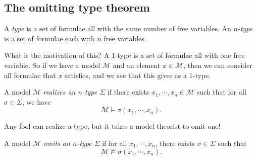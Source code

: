 \documentclass[a4paper]{article}
\begin{document}
%
%
%

\subsection{The omitting type theorem}
\begin{defi}[Type]
  A \emph{type} is a set of formulae all with the same number of free variables. An \emph{$n$-type} is a set of formulae each with $n$ free variables.
\end{defi}
What is the motivation of this? A $1$-type is a set of formulae all with one free variable. So if we have a model $\mathcal{M}$ and an element $x \in \mathcal{M}$, then we can consider all formulae that $x$ satisfies, and we see that this gives as a $1$-type.

\begin{defi}
  A model $\mathcal{M}$ \emph{realizes an $n$-type $\Sigma$} if there exists $x_1, \cdots, x_n \in \mathcal{M}$ such that for all $\sigma \in \Sigma$, we have
  \[
    \mathcal{M} \vDash \sigma(x_1, \cdots, x_n).
  \]
\end{defi}
%

Any fool can realize a type, but it takes a model theorist to omit one!

\begin{defi}
  A model $\mathcal{M}$ \emph{omits an $n$-type $\Sigma$} if for all $x_1, \cdots, x_n$, there exists $\sigma \in \Sigma$ such that
  \[
    \mathcal{M} \not\vDash \sigma(x_1, \cdots, x_n).
  \]
\end{defi}
\end{document}
